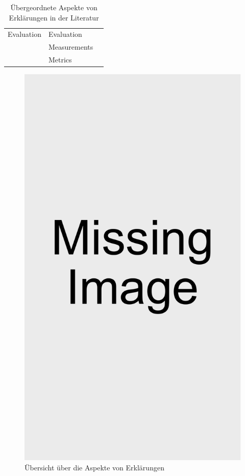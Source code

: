 \begin{table}
\begin{tabular}{|p{}|p{}|p{}|}
            \hline
            Evaluation      & Evaluation            & \cite{kohl_explainability_2019} \cite{doshi2017towards} \\
                            & Measurements          & \cite{waa_evaluating_2021} \cite{balog_measuring_2020} \\
                            & Metrics               & \cite{nunes_systematic_2017} \cite{anjomshoae2019explainable}
                                                      \cite{chari_explanation_2020} \cite{waa_evaluating_2021}\\
            \hline
        \end{tabular}
    \caption{Übergeordnete Aspekte von Erklärungen in der Literatur}
    \label{tab:model_explaination_aspects}
\end{table}

\begin{figure}[htb!]
    \includegraphics[width=0.25\linewidth]{contents/res/missing_image.pdf}
    \caption{Übersicht über die Aspekte von Erklärungen}
    \label{fig:model_overview}
\end{figure}

\newpage







